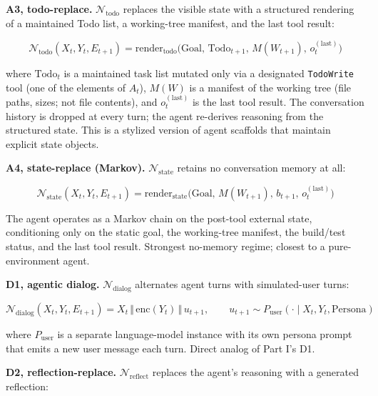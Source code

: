 \documentclass{article}
\theoremstyle{plain}
\theoremstyle{definition}
\begin{document}
\textbf{A3, todo-replace.} $\mathcal{N}_\text{todo}$ replaces the visible state with a structured rendering of a maintained Todo list, a working-tree manifest, and the last tool result:

\begin{equation*}
\mathcal{N}_\text{todo}(X_t, Y_t, E_{t+1}) = \mathrm{render}_\text{todo}\bigl(\text{Goal},\, \mathrm{Todo}_{t+1},\, M(W_{t+1}),\, o_t^{(\text{last})}\bigr)
\end{equation*}

where $\mathrm{Todo}_t$ is a maintained task list mutated only via a designated \texttt{TodoWrite} tool (one of the elements of $A_t$), $M(W)$ is a manifest of the working tree (file paths, sizes; not file contents), and $o_t^{(\text{last})}$ is the last tool result. The conversation history is dropped at every turn; the agent re-derives reasoning from the structured state. This is a stylized version of agent scaffolds that maintain explicit state objects.

\textbf{A4, state-replace (Markov).} $\mathcal{N}_\text{state}$ retains no conversation memory at all:

\begin{equation*}
\mathcal{N}_\text{state}(X_t, Y_t, E_{t+1}) = \mathrm{render}_\text{state}\bigl(\text{Goal},\, M(W_{t+1}),\, b_{t+1},\, o_t^{(\text{last})}\bigr)
\end{equation*}

The agent operates as a Markov chain on the post-tool external state, conditioning only on the static goal, the working-tree manifest, the build/test status, and the last tool result. Strongest no-memory regime; closest to a pure-environment agent.

\textbf{D1, agentic dialog.} $\mathcal{N}_\text{dialog}$ alternates agent turns with simulated-user turns:

\begin{equation*}
\mathcal{N}_\text{dialog}(X_t, Y_t, E_{t+1}) = X_t \,\Vert\, \mathrm{enc}(Y_t) \,\Vert\, u_{t+1}, \qquad u_{t+1} \sim P_\text{user}(\cdot \mid X_t, Y_t, \text{Persona})
\end{equation*}

where $P_\text{user}$ is a separate language-model instance with its own persona prompt that emits a new user message each turn. Direct analog of Part I's D1.

\textbf{D2, reflection-replace.} $\mathcal{N}_\text{reflect}$ replaces the agent's reasoning with a generated reflection:
\end{document}

